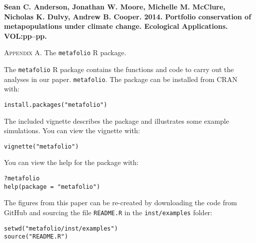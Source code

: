 \documentclass[12pt]{article}
\begin{document}
\textbf{Sean C. Anderson, Jonathan W. Moore, Michelle M. McClure, Nicholas K. Dulvy, Andrew B. Cooper. 2014. Portfolio conservation of metapopulations under climate change. Ecological Applications. VOL:pp--pp.}

\bigskip

\textsc{Appendix A.} The \texttt{metafolio} \textsf{R} package.

\bigskip

The \texttt{metafolio} \textsf{R} package contains the functions and code to carry out the analyses in our paper. \texttt{metafolio}. The package can be installed from CRAN with:

\begin{verbatim}
install.packages("metafolio")
\end{verbatim}


The included vignette describes the package and illustrates some example simulations. You can view the vignette with:

\begin{verbatim}
vignette("metafolio")
\end{verbatim}

You can view the help for the package with:

\begin{verbatim}
?metafolio
help(package = "metafolio")
\end{verbatim}

The figures from this paper can be re-created by downloading the code from GitHub and sourcing the file \texttt{README.R} in the \texttt{inst/examples} folder:

\begin{verbatim}
setwd("metafolio/inst/examples")
source("README.R")
\end{verbatim}
\end{document}
